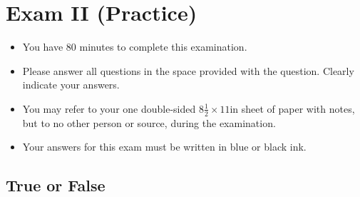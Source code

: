 \chapter[100]{Exam II (Practice)}
\label{ch:examii-practice}

\begin{preamble}
\begin{itemize}
\item You have 80 minutes to complete this examination.
\item Please answer all questions in the space provided with the
  question.  Clearly indicate your answers.
\item You may refer to your one double-sided $8\frac{1}{2} \times 11$in
  sheet of paper with notes, but to no other person or source, during the
  examination.

\item Your answers for this exam must be written in blue or black ink.

\end{itemize}
\end{preamble}


\section[10]{True or False}

